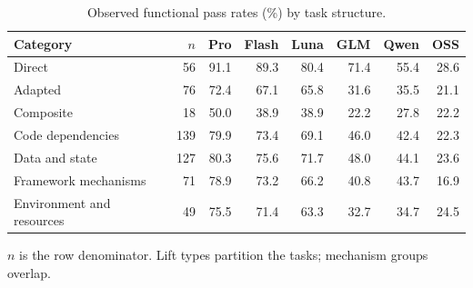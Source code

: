 \begin{table}[tbp]
  \centering
  \footnotesize
  \caption{Observed functional pass rates (\%) by task structure.}
  \label{tab:structure}
  \begin{tabularx}{\linewidth}{@{}Xrrrrrrr@{}}
    \toprule
    Category & $n$ & Pro & Flash & Luna & GLM & Qwen & OSS \\
    \midrule
    Direct & 56 & 91.1 & 89.3 & 80.4 & 71.4 & 55.4 & 28.6 \\
    Adapted & 76 & 72.4 & 67.1 & 65.8 & 31.6 & 35.5 & 21.1 \\
    Composite & 18 & 50.0 & 38.9 & 38.9 & 22.2 & 27.8 & 22.2 \\
    \midrule
    Code dependencies & 139 & 79.9 & 73.4 & 69.1 & 46.0 & 42.4 & 22.3 \\
    Data and state & 127 & 80.3 & 75.6 & 71.7 & 48.0 & 44.1 & 23.6 \\
    Framework mechanisms & 71 & 78.9 & 73.2 & 66.2 & 40.8 & 43.7 & 16.9 \\
    Environment and resources & 49 & 75.5 & 71.4 & 63.3 & 32.7 & 34.7 & 24.5 \\
    \bottomrule
  \end{tabularx}
  \par\smallskip\begin{minipage}{\linewidth}\scriptsize
  $n$ is the row denominator. Lift types partition the tasks; mechanism groups overlap.
  \end{minipage}
\end{table}
